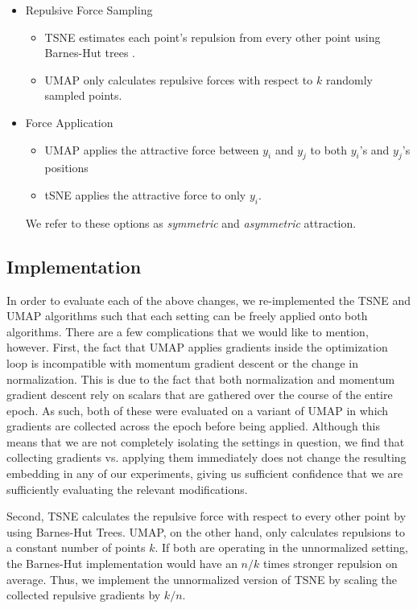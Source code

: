 \documentclass[sigconf, nonacm]{acmart}
\begin{document}
\begin{itemize}
    \item Repulsive Force Sampling
        \begin{itemize}
            \item TSNE estimates each point's repulsion from every other point using Barnes-Hut trees \cite{barnes1986hierarchical}.
        \item UMAP only calculates repulsive forces with respect to $k$ randomly sampled points.
        \end{itemize}

    \item Force Application
        \begin{itemize}
        \item UMAP applies the attractive force between $y_i$ and $y_j$ to both $y_i$'s and $y_j$'s positions
        \item tSNE applies the attractive force to only $y_i$.
        \end{itemize}
        We refer to these options as \textit{symmetric} and \textit{asymmetric} attraction.

\end{itemize}

\subsection{Implementation}
In order to evaluate each of the above changes, we re-implemented the TSNE and UMAP algorithms such that each setting can be freely applied onto both algorithms.
There are a few complications that we would like to mention, however. First, the fact that UMAP applies gradients inside the optimization loop is incompatible
with momentum gradient descent or the change in normalization. This is due to the fact that both normalization and momentum gradient
descent rely on scalars that are gathered over the course of the entire epoch. As such, both of these were evaluated on a variant of UMAP in which gradients are
collected across the epoch before being applied. Although this means that we are not completely isolating the settings in question, we find that collecting
gradients vs. applying them immediately does not change the resulting embedding in any of our experiments, giving us sufficient confidence that we are
sufficiently evaluating the relevant modifications.

Second, TSNE calculates the repulsive force with respect to every other point by using Barnes-Hut Trees. UMAP, on the other hand, only calculates repulsions to
a constant number of points $k$. If both are operating in the unnormalized setting, the Barnes-Hut implementation would have an $n/k$ times stronger repulsion
on average. Thus, we implement the unnormalized version of TSNE by scaling the collected repulsive gradients by $k/n$.
\end{document}
